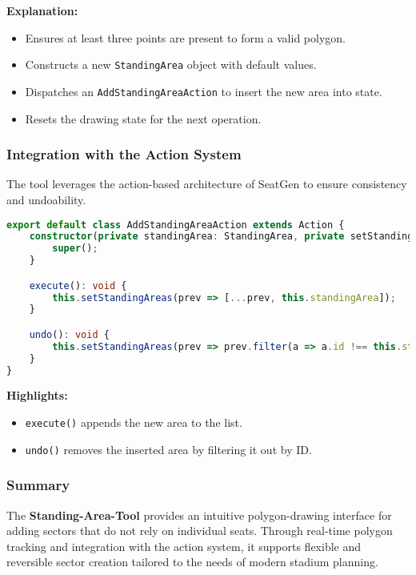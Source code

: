 \textbf{Explanation:}
\begin{itemize}
    \item Ensures at least three points are present to form a valid polygon.
    \item Constructs a new \texttt{StandingArea} object with default values.
    \item Dispatches an \texttt{AddStandingAreaAction} to insert the new area into state.
    \item Resets the drawing state for the next operation.
\end{itemize}

\subsubsection{Integration with the Action System}
The tool leverages the action-based architecture of SeatGen to ensure consistency and undoability.

\begin{lstlisting}[language=TypeScript, caption=AddStandingAreaAction, label=lst:add-standingarea-action]
export default class AddStandingAreaAction extends Action {
    constructor(private standingArea: StandingArea, private setStandingAreas: React.Dispatch<React.SetStateAction<StandingArea[]>>) {
        super();
    }

    execute(): void {
        this.setStandingAreas(prev => [...prev, this.standingArea]);
    }

    undo(): void {
        this.setStandingAreas(prev => prev.filter(a => a.id !== this.standingArea.id));
    }
}
\end{lstlisting}

\textbf{Highlights:}
\begin{itemize}
    \item \texttt{execute()} appends the new area to the list.
    \item \texttt{undo()} removes the inserted area by filtering it out by ID.
\end{itemize}

\subsubsection{Summary}
The \textbf{Standing-Area-Tool} provides an intuitive polygon-drawing interface for adding sectors that do not rely on individual seats. Through real-time polygon tracking and integration with the action system, it supports flexible and reversible sector creation tailored to the needs of modern stadium planning.
